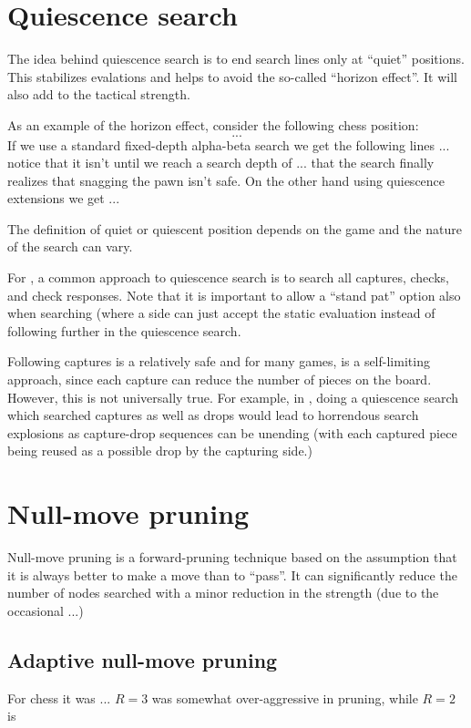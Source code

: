 \documentclass[10pt,dvipdfmx]{report}
\newcommand{\g}[1]{{\sc{#1}}\index{{\sc{#1}}}}
\begin{document}
\section{Quiescence search}

The idea behind quiescence search is to end search lines only at ``quiet'' positions.
This stabilizes evalations and helps to avoid the so-called ``horizon effect''.
It will also add to the tactical strength.

As an example of the horizon effect, consider the following chess position:
\[ ... \]
If we use a standard fixed-depth alpha-beta search we get the following lines ...
notice that it isn't until we reach a search depth of ... that the search finally
realizes that snagging the pawn isn't safe.
On the other hand using quiescence extensions we get ...

The definition of quiet or quiescent position depends on the game and the nature
of the search can vary.

For \g{chess}, a common approach to quiescence search is
to search all captures, checks,
and check responses.  Note that it is important to allow a ``stand pat'' option also when
searching (where a side can just accept the static evaluation instead of following
further in the quiescence search.

Following captures is a relatively safe and for many games, is a self-limiting approach,
since each capture can reduce the number of pieces on the board.  However, this is not
universally true.
For example, in \g{shogi}, doing a quiescence search which searched captures as well as drops would
lead to horrendous search explosions as capture-drop sequences can be unending
(with each captured piece being reused as a possible drop by the capturing side.)

\section{Null-move pruning}
Null-move pruning is a forward-pruning technique based on the assumption that it
is always better to make a move than to ``pass''.
It can significantly reduce the number of nodes searched with a minor reduction
in the strength (due to the occasional ...)

\subsection{Adaptive null-move pruning}
For chess it was ...
$R=3$ was somewhat over-aggressive in pruning,
while $R=2$ is
\end{document}
